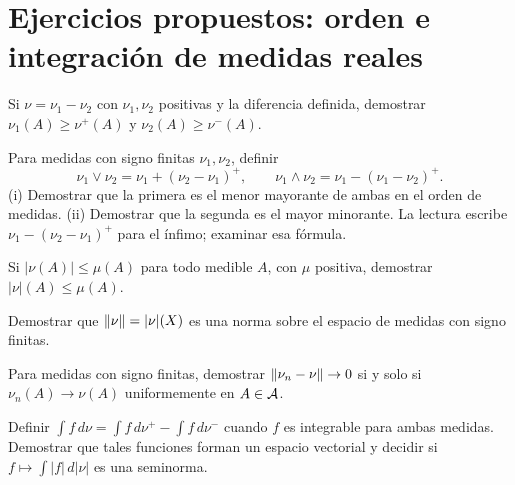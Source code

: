 \section{Ejercicios propuestos: orden e integración de medidas reales}
\begin{ejercicio}\label{ej:v2-l25-1}
Si $\nu=\nu_1-\nu_2$ con $\nu_1,\nu_2$ positivas y la diferencia definida, demostrar $\nu_1(A)\ge\nu^+(A)$ y $\nu_2(A)\ge\nu^-(A)$.
\end{ejercicio}

\begin{ejercicio}\label{ej:v2-l25-2}
Para medidas con signo finitas $\nu_1,\nu_2$, definir
\[
 \nu_1\vee\nu_2=\nu_1+(\nu_2-\nu_1)^+,
 \qquad \nu_1\wedge\nu_2=\nu_1-(\nu_1-\nu_2)^+.
\]
(i) Demostrar que la primera es el menor mayorante de ambas en el orden de medidas. (ii) Demostrar que la segunda es el mayor minorante. La lectura escribe $\nu_1-(\nu_2-\nu_1)^+$ para el ínfimo; examinar esa fórmula.
\end{ejercicio}

\begin{ejercicio}\label{ej:v2-l25-3}
Si $|\nu(A)|\le\mu(A)$ para todo medible $A$, con $\mu$ positiva, demostrar $|\nu|(A)\le\mu(A)$.
\end{ejercicio}

\begin{ejercicio}\label{ej:v2-l25-4}
Demostrar que $\left\lVert\nu\right\rVert=|\nu|(X)$ es una norma sobre el espacio de medidas con signo finitas.
\end{ejercicio}

\begin{ejercicio}\label{ej:v2-l25-5}
Para medidas con signo finitas, demostrar $\left\lVert\nu_n-\nu\right\rVert\to0$ si y solo si $\nu_n(A)\to\nu(A)$ uniformemente en $A\in\mathcal A$.
\end{ejercicio}

\begin{ejercicio}\label{ej:v2-l25-6}
Definir $\int f\,d\nu=\int f\,d\nu^+-\int f\,d\nu^-$ cuando $f$ es integrable para ambas medidas. Demostrar que tales funciones forman un espacio vectorial y decidir si $f\mapsto\int|f|\,d|\nu|$ es una seminorma.
\end{ejercicio}


